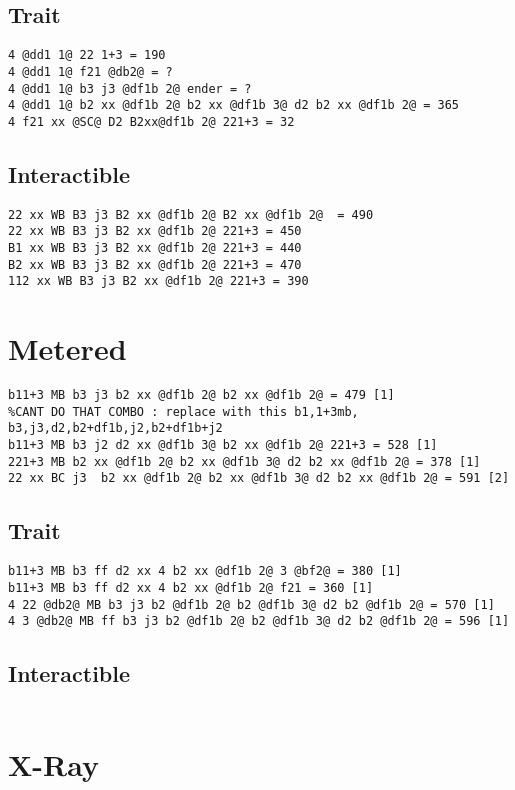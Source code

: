 \documentclass[main.tex]{subfiles}
\begin{document}
\subsection{Trait}

\begin{lstlisting}[language=FG]
4 @dd1 1@ 22 1+3 = 190
4 @dd1 1@ f21 @db2@ = ?
4 @dd1 1@ b3 j3 @df1b 2@ ender = ?
4 @dd1 1@ b2 xx @df1b 2@ b2 xx @df1b 3@ d2 b2 xx @df1b 2@ = 365  
4 f21 xx @SC@ D2 B2xx@df1b 2@ 221+3 = 32
\end{lstlisting}


\subsection{Interactible}
\begin{lstlisting}[language=FG]
22 xx WB B3 j3 B2 xx @df1b 2@ B2 xx @df1b 2@  = 490
22 xx WB B3 j3 B2 xx @df1b 2@ 221+3 = 450
B1 xx WB B3 j3 B2 xx @df1b 2@ 221+3 = 440
B2 xx WB B3 j3 B2 xx @df1b 2@ 221+3 = 470
112 xx WB B3 j3 B2 xx @df1b 2@ 221+3 = 390
\end{lstlisting}

\section{Metered}


\begin{lstlisting}[language=FG]
b11+3 MB b3 j3 b2 xx @df1b 2@ b2 xx @df1b 2@ = 479 [1]
%CANT DO THAT COMBO : replace with this b1,1+3mb, b3,j3,d2,b2+df1b,j2,b2+df1b+j2
b11+3 MB b3 j2 d2 xx @df1b 3@ b2 xx @df1b 2@ 221+3 = 528 [1]
221+3 MB b2 xx @df1b 2@ b2 xx @df1b 3@ d2 b2 xx @df1b 2@ = 378 [1]
22 xx BC j3  b2 xx @df1b 2@ b2 xx @df1b 3@ d2 b2 xx @df1b 2@ = 591 [2]
\end{lstlisting}

\subsection{Trait}
\begin{lstlisting}[language=FG]
b11+3 MB b3 ff d2 xx 4 b2 xx @df1b 2@ 3 @bf2@ = 380 [1]
b11+3 MB b3 ff d2 xx 4 b2 xx @df1b 2@ f21 = 360 [1]
4 22 @db2@ MB b3 j3 b2 @df1b 2@ b2 @df1b 3@ d2 b2 @df1b 2@ = 570 [1]
4 3 @db2@ MB ff b3 j3 b2 @df1b 2@ b2 @df1b 3@ d2 b2 @df1b 2@ = 596 [1]
\end{lstlisting}


\subsection{Interactible}
\begin{lstlisting}[language=FG]

\end{lstlisting}

\section{X-Ray}
\begin{lstlisting}[language=FG]

\end{lstlisting}
\end{document}
